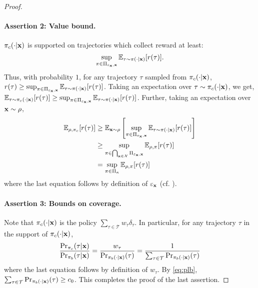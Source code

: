 \begin{proof}
\paragraph{Assertion 2: Value bound.} $\pi_c (\cdot|\mathbf{x})$ is supported on trajectories which collect reward at least: $$\sup_{\pi \in \Pi_{\varepsilon_{\mathbf{x}},\mathbf{x}}} \mathbb{E}_{\tau \sim \pi(\cdot|\mathbf{x})} [r(\tau)].$$ Thus, with probability $1$, for any trajectory $\tau$ sampled from $\pi_c (\cdot|\mathbf{x})$, $r(\tau) \ge \sup_{\pi \in \Pi_{\varepsilon_{\mathbf{x}},\mathbf{x}}} \mathbb{E}_{\tau \sim \pi(\cdot|\mathbf{x})} [r(\tau)]$. Taking an expectation over $\tau \sim \pi_c (\cdot|\mathbf{x})$, we get, $\mathbb{E}_{\tau \sim \pi_c (\cdot|\mathbf{x})} [r(\tau)] \ge \sup_{\pi \in \Pi_{\varepsilon_{\mathbf{x}},\mathbf{x}}} \mathbb{E}_{\tau \sim \pi(\cdot|\mathbf{x})} [r(\tau)]$. Further, taking an expectation over $\mathbf{x} \sim \rho$,
\begin{align*}
    \mathbb{E}_{\rho, \pi_c} [r(\tau)] &\ge \mathbb{E}_{\mathbf{x} \sim \rho} \left[ \sup_{\pi \in \Pi_{\varepsilon_{\mathbf{x}},\mathbf{x}}} \mathbb{E}_{\tau \sim \pi(\cdot|\mathbf{x})} [r(\tau)] \right] \\
    &\ge \sup_{\pi \in \bigcap_{\mathbf{x} \in \mathcal{X}} \Pi_{\varepsilon_{\mathbf{x}},\mathbf{x}}} \mathbb{E}_{\rho,\pi} [r(\tau)] \\
    &= \sup_{\pi \in \Pi_{\kappa}} \mathbb{E}_{\rho,\pi} [r(\tau)]
\end{align*}
where the last equation follows by definition of $\varepsilon_{\mathbf{x}}$ (cf. ).

\paragraph{Assertion 3: Bounds on coverage.} Note that $\pi_c (\cdot|\mathbf{x})$ is the policy $\sum_{\tau \in \mathcal{T}} w_\tau \delta_\tau$. In particular, for any trajectory $\tau$ in the support of $\pi_c (\cdot|\mathbf{x})$,
\begin{align}
    \frac{\Pr_{\pi_c} (\tau|\mathbf{x})}{\Pr_{\pi_b} (\tau|\mathbf{x})} = \frac{w_\tau}{\Pr_{\pi_b(\cdot|\mathbf{x})} (\tau)} = \frac{1}{\sum_{\tau \in \mathcal{T}} \Pr_{\pi_b (\cdot|\mathbf{x})} (\tau)}
\end{align}
where the last equation follows by definition of $w_\tau$. By \cref{eq:plb}, $\sum_{\tau \in \mathcal{T}} \Pr_{\pi_b(\cdot|\mathbf{x})} (\tau) \ge c_0$. This completes the proof of the last assertion.
\end{proof}

